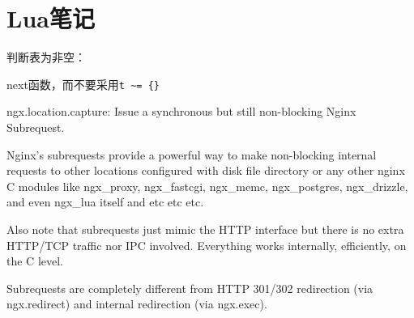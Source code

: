 \section{Lua笔记}
判断表为非空：

next函数，而不要采用\verb$t ~= {}$



ngx.location.capture:
Issue a synchronous but still non-blocking Nginx Subrequest.



Nginx's subrequests provide a powerful way to make non-blocking internal requests to other locations configured with disk file directory or any other nginx C modules like ngx_proxy, ngx_fastcgi, ngx_memc, ngx_postgres, ngx_drizzle, and even ngx_lua itself and etc etc etc.

Also note that subrequests just mimic the HTTP interface but there is no extra HTTP/TCP traffic nor IPC involved. Everything works internally, efficiently, on the C level.

Subrequests are completely different from HTTP 301/302 redirection (via ngx.redirect) and internal redirection (via ngx.exec).